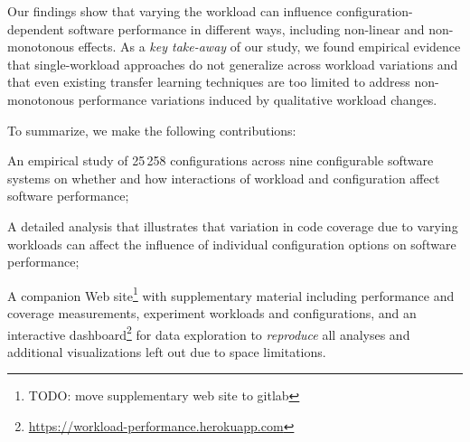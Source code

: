 {\color{edited}Our findings show that varying the workload can influence con\-fi\-gu\-ra\-tion-de\-pen\-dent software performance in different ways, including non-linear and non-monotonous effects. 
As a \textit{key take-away} of our study, we found empirical evidence that single-workload approaches do not generalize across workload variations and that even existing transfer learning techniques are too limited to address non-monotonous performance variations induced by qualitative workload changes. 
}

To summarize, we make the following contributions: 
\begin{compactitem}
	\item An empirical study of 25\,258 configurations across nine configurable software systems on whether and how interactions of workload and configuration affect software  performance;
	
	\item {\color{red}A detailed analysis that illustrates that variation in code coverage due to varying workloads can affect the influence of individual configuration options on software performance; }
	
	\item A companion Web site\footnote{\color{red}TODO: move supplementary web site to gitlab} with supplementary material including performance and coverage measurements, experiment workloads and configurations, and an interactive dashboard\footnote{\url{https://workload-performance.herokuapp.com}} for data exploration to \textit{reproduce} all analyses and additional visualizations left out due to space limitations.
	
\end{compactitem}



